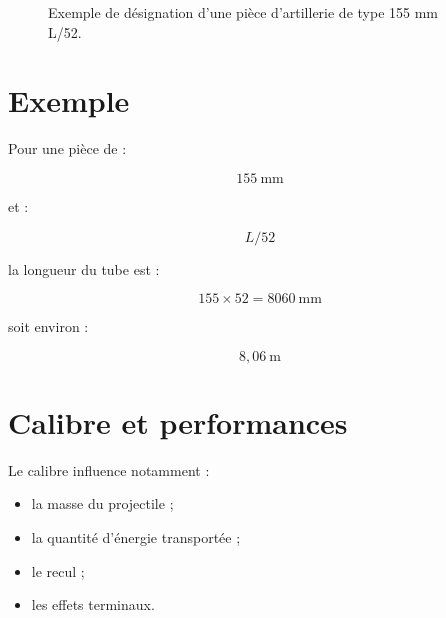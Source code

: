 \begin{figure}[htbp]
\centering


\caption{Exemple de désignation d'une pièce d'artillerie de type 155 mm L/52.}
\label{fig:l52}

\end{figure}

\section{Exemple}

Pour une pièce de :

\begin{equation}
155~\text{mm}
\end{equation}

et :

\begin{equation}
L/52
\end{equation}

la longueur du tube est :

\begin{equation}
155\times52
=
8060~\text{mm}
\end{equation}

soit environ :

\begin{equation}
8,06~\text{m}
\end{equation}

\section{Calibre et performances}

Le calibre influence notamment :

\begin{itemize}
    \item la masse du projectile ;
    \item la quantité d'énergie transportée ;
    \item le recul ;
    \item les effets terminaux.
\end{itemize}

